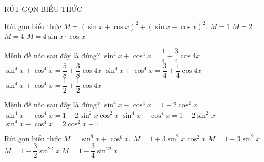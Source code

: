 \begin{dang}
    {RÚT GỌN BIỂU THỨC}
\end{dang}

\begin{ex}%
Rút gọn biểu thức $M=\left({\sin x+\cos x}\right)^2+\left({\sin x-\cos x}\right)^2.$ 
\choice
{$M=1$}
{\True $M=2$}
{$M=4$}
{$M=4\sin x \cdot \cos x$}
\end{ex}

\begin{ex}%
Mệnh đề nào sau đây là đúng?
\choice
{$\sin ^4x+\cos ^4x=\dfrac{1}{4}+\dfrac{3}{4}\cos 4x$}
{$\sin ^4x+\cos ^4x=\dfrac{5}{8}+\dfrac{3}{8}\cos 4x$}
{\True $\sin ^4x+\cos ^4x=\dfrac{3}{4}+\dfrac{1}{4}\cos 4x$}
{$\sin ^4x+\cos ^4x=\dfrac{1}{2}+\dfrac{1}{2}\cos 4x$}
\end{ex}

\begin{ex}%
Mệnh đề nào sau đây là đúng?
\choice
{\True $\sin ^4x-\cos ^4x=1-2\cos ^2x$}
{$\sin ^4x-\cos ^4x=1-2\sin ^2x\cos ^2x$}
{$\sin ^4x-\cos ^4x=1-2\sin ^2x$}
{$\sin ^4x-\cos ^4x=2\cos ^2x-1$}
\end{ex}

\begin{ex}%
Rút gọn biểu thức $M=\sin ^6x+\cos ^6x.$
\choice
{$M=1+3\sin ^2x\cos ^2x$}
{$M=1-3\sin ^2x$}
{$M=1-\dfrac{3}{2}\sin ^22x$}
{\True $M=1-\dfrac{3}{4}\sin ^22x$}
 \end{ex}

